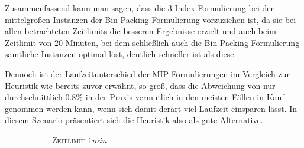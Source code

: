 Zusammenfassend kann man sagen, dass die 3-Index-Formulierung bei den mittelgroßen Instanzen der Bin-Packing-Formulierung vorzuziehen ist,
da sie bei allen betrachteten Zeitlimits die besseren Ergebnisse erzielt und auch beim Zeitlimit von $20$ Minuten, bei dem schließlich auch die Bin-Packing-Formulierung sämtliche Instanzen optimal löst, deutlich schneller ist als diese.

Dennoch ist der Laufzeitunterschied der MIP-Formulierungen im Vergleich zur Heuristik wie bereits zuvor erwähnt, so groß, dass die Abweichung von nur durchschnittlich $0.8 \%$ in der Praxis vermutlich in den meisten Fällen in Kauf genommen werden kann, wenn sich damit derart viel Laufzeit einsparen lässt. In diesem Szenario präsentiert sich die Heuristik also als gute Alternative.

\begin{figure}[H]
\begin{subfigure}[b]{0.3\textwidth}
\centering
{}
\caption{\textsc{Zeitlimit} $1min$}
\label{fig:res_b=2_m_a}
\end{subfigure}
\begin{subfigure}[b]{0.3\textwidth}
\centering
{}
\end{subfigure}
\end{figure}
